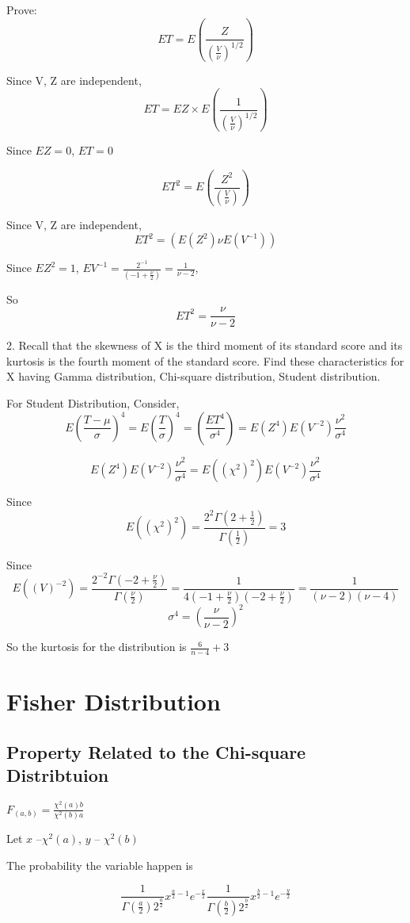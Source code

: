 \documentclass{article}
\begin{document}
Prove:
$$E T = E(\frac{Z}{(\frac{V}{\nu})^{1/2}})$$

Since V, Z are independent,
$$E T = {EZ} \times E(\frac{1}{(\frac{V}{\nu})^{1/2}})$$

Since $EZ = 0$, $ET = 0$

$$E T^2 = E(\frac{Z^2}{(\frac{V}{\nu})})$$

Since V, Z are independent,
$$E T^2 = ({E(Z^2)}\nu E({V}^{-1}))$$

Since $EZ^2 = 1$, $EV^{-1} = \frac{2^{-1}}{(-1+\frac{\nu}2)} = \frac{1}{\nu-2} $,

So $$E T^2 = \frac{\nu}{\nu-2}$$

2. Recall that the skewness of X is the third moment of its standard score and its kurtosis is the fourth moment of the standard score. Find these characteristics for X having Gamma distribution, Chi-square distribution, Student distribution.

For Student Distribution, Consider, 
$$E (\frac{T-\mu}{\sigma})^4 = E (\frac{T}{\sigma})^4 = (\frac{ET^4}{\sigma^4}) = E(Z^4) E(V^{-2}) \frac{\nu^{2}}{\sigma^4}$$

$$E(Z^4) E(V^{-2}) \frac{\nu^{2}}{\sigma^4} = E((\chi^2)^2) E(V^{-2}) \frac{\nu^{2}}{\sigma^4}$$

Since $$E((\chi^2)^2) = \frac{2^{2} \Gamma(2+\frac{1}2)}{\Gamma(\frac{1}2)} = 3 $$

Since $$E((V)^{-2}) = \frac{2^{-2} \Gamma(-2+\frac{\nu}2)}{\Gamma(\frac{\nu}2)} = \frac{1}{4 {(-1+\frac{\nu}2)}{(-2+\frac{\nu}2)}} =\frac{1}{(\nu-2)(\nu-4)}$$
$$\sigma^4 = (\frac{\nu}{\nu-2})^2$$

So the kurtosis for the distribution is $\frac{6}{n-4}+3$


\section{Fisher Distribution}

\subsection{Property Related to the Chi-square Distribtuion}

$F_{(a,b)} = \frac{\chi^2(a) b}{\chi^2(b) a}$

Let $x$ --$\chi^2(a)$, $y$ -- $\chi^2(b)$

The probability the variable happen is 

$$\frac{1}{\Gamma(\frac{a}2)2^{\frac{a}2}} x ^{\frac{a}2-1}e^{-\frac{x}2} \frac{1}{\Gamma(\frac{b}2)2^{\frac{b}2}} x ^{\frac{b}2-1}e^{-\frac{y}2}$$
\end{document}
